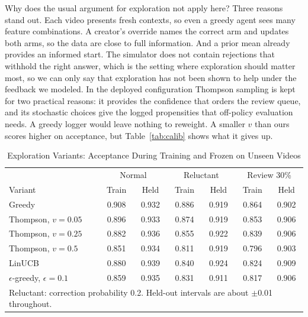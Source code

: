 \documentclass{ieeeaccess}
\begin{document}
Why does the usual argument for exploration not apply here? Three reasons stand out. Each video presents fresh contexts, so even a greedy agent sees many feature combinations. A creator's override names the correct arm and updates both arms, so the data are close to full information. And a prior mean already provides an informed start. The simulator does not contain rejections that withhold the right answer, which is the setting where exploration should matter most, so we can only say that exploration has not been shown to help under the feedback we modeled. In the deployed configuration Thompson sampling is kept for two practical reasons: it provides the confidence that orders the review queue, and its stochastic choices give the logged propensities that off-policy evaluation needs. A greedy logger would leave nothing to reweight. A smaller $v$ than ours scores higher on acceptance, but Table~\ref{tab:calib} shows what it gives up.

\begin{table}[t]
\caption{Exploration Variants: Acceptance During Training and Frozen on Unseen Videos}
\label{tab:explore}
\setlength{\tabcolsep}{2.2pt}
\centering
\begin{tabular}{|l|cc|cc|cc|}
\hline
 & \multicolumn{2}{c|}{Normal} & \multicolumn{2}{c|}{Reluctant} & \multicolumn{2}{c|}{Review 30\%} \\
Variant & Train & Held & Train & Held & Train & Held \\
\hline
Greedy & 0.908 & 0.932 & 0.886 & 0.919 & 0.864 & 0.902 \\
Thompson, $v=0.05$ & 0.896 & 0.933 & 0.874 & 0.919 & 0.853 & 0.906 \\
Thompson, $v=0.25$ & 0.882 & 0.936 & 0.855 & 0.922 & 0.839 & 0.906 \\
Thompson, $v=0.5$ & 0.851 & 0.934 & 0.811 & 0.919 & 0.796 & 0.903 \\
LinUCB & 0.880 & 0.939 & 0.840 & 0.924 & 0.824 & 0.909 \\
$\epsilon$-greedy, $\epsilon=0.1$ & 0.859 & 0.935 & 0.831 & 0.911 & 0.817 & 0.906 \\
\hline
\multicolumn{7}{p{80mm}}{Reluctant: correction probability 0.2. Held-out intervals are about $\pm$0.01 throughout.}
\end{tabular}
\end{table}
\end{document}
